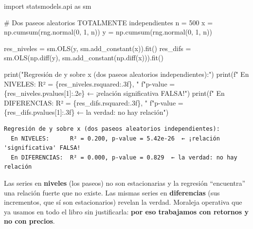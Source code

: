 \documentclass[
  spanish,
  letterpaper,
  DIV=11,
  numbers=noendperiod]{scrreprt}
\newenvironment{Shaded}{\begin{snugshade}}{\end{snugshade}}
\newcommand{\BuiltInTok}[1]{\textcolor[rgb]{0.00,0.23,0.31}{#1}}
\newcommand{\CommentTok}[1]{\textcolor[rgb]{0.37,0.37,0.37}{#1}}
\newcommand{\DecValTok}[1]{\textcolor[rgb]{0.68,0.00,0.00}{#1}}
\newcommand{\ImportTok}[1]{\textcolor[rgb]{0.00,0.46,0.62}{#1}}
\newcommand{\NormalTok}[1]{\textcolor[rgb]{0.00,0.23,0.31}{#1}}
\newcommand{\OperatorTok}[1]{\textcolor[rgb]{0.37,0.37,0.37}{#1}}
\newcommand{\SpecialCharTok}[1]{\textcolor[rgb]{0.37,0.37,0.37}{#1}}
\newcommand{\SpecialStringTok}[1]{\textcolor[rgb]{0.13,0.47,0.30}{#1}}
\newcommand{\StringTok}[1]{\textcolor[rgb]{0.13,0.47,0.30}{#1}}
\begin{document}
\label{espuria}
\begin{Shaded}
\begin{Highlighting}[]
\ImportTok{import}\NormalTok{ statsmodels.api }\ImportTok{as}\NormalTok{ sm}

\CommentTok{\# Dos paseos aleatorios TOTALMENTE independientes}
\NormalTok{n }\OperatorTok{=} \DecValTok{500}
\NormalTok{x }\OperatorTok{=}\NormalTok{ np.cumsum(rng.normal(}\DecValTok{0}\NormalTok{, }\DecValTok{1}\NormalTok{, n))}
\NormalTok{y }\OperatorTok{=}\NormalTok{ np.cumsum(rng.normal(}\DecValTok{0}\NormalTok{, }\DecValTok{1}\NormalTok{, n))}

\NormalTok{res\_niveles }\OperatorTok{=}\NormalTok{ sm.OLS(y, sm.add\_constant(x)).fit()}
\NormalTok{res\_difs }\OperatorTok{=}\NormalTok{ sm.OLS(np.diff(y), sm.add\_constant(np.diff(x))).fit()}

\BuiltInTok{print}\NormalTok{(}\StringTok{"Regresión de y sobre x (dos paseos aleatorios independientes):"}\NormalTok{)}
\BuiltInTok{print}\NormalTok{(}\SpecialStringTok{f"  En NIVELES:      R² = }\SpecialCharTok{\{}\NormalTok{res\_niveles}\SpecialCharTok{.}\NormalTok{rsquared}\SpecialCharTok{:.3f\}}\SpecialStringTok{, "}
      \SpecialStringTok{f"p{-}value = }\SpecialCharTok{\{}\NormalTok{res\_niveles}\SpecialCharTok{.}\NormalTok{pvalues[}\DecValTok{1}\NormalTok{]}\SpecialCharTok{:.2e\}}\SpecialStringTok{  ← ¡relación \textquotesingle{}significativa\textquotesingle{} FALSA!"}\NormalTok{)}
\BuiltInTok{print}\NormalTok{(}\SpecialStringTok{f"  En DIFERENCIAS:  R² = }\SpecialCharTok{\{}\NormalTok{res\_difs}\SpecialCharTok{.}\NormalTok{rsquared}\SpecialCharTok{:.3f\}}\SpecialStringTok{, "}
      \SpecialStringTok{f"p{-}value = }\SpecialCharTok{\{}\NormalTok{res\_difs}\SpecialCharTok{.}\NormalTok{pvalues[}\DecValTok{1}\NormalTok{]}\SpecialCharTok{:.3f\}}\SpecialStringTok{  ← la verdad: no hay relación"}\NormalTok{)}
\end{Highlighting}
\end{Shaded}

\begin{verbatim}
Regresión de y sobre x (dos paseos aleatorios independientes):
  En NIVELES:      R² = 0.200, p-value = 5.42e-26  ← ¡relación 'significativa' FALSA!
  En DIFERENCIAS:  R² = 0.000, p-value = 0.829  ← la verdad: no hay relación
\end{verbatim}

Las series en \textbf{niveles} (los paseos) no son estacionarias y la
regresión ``encuentra'' una relación fuerte que no existe. Las mismas
series en \textbf{diferencias} (sus incrementos, que sí son
estacionarios) revelan la verdad. Moraleja operativa que ya usamos en
todo el libro sin justificarla: \textbf{por eso trabajamos con retornos
y no con precios}.
\end{document}
